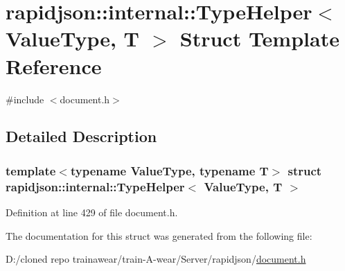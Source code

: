 \hypertarget{structrapidjson_1_1internal_1_1_type_helper}{}\section{rapidjson\+::internal\+::Type\+Helper$<$ Value\+Type, T $>$ Struct Template Reference}
\label{structrapidjson_1_1internal_1_1_type_helper}


{\ttfamily \#include $<$document.\+h$>$}



\subsection{Detailed Description}
\subsubsection*{template$<$typename Value\+Type, typename T$>$\newline
struct rapidjson\+::internal\+::\+Type\+Helper$<$ Value\+Type, T $>$}



Definition at line 429 of file document.\+h.



The documentation for this struct was generated from the following file\+:\begin{DoxyCompactItemize}
\item 
D\+:/cloned repo trainawear/train-\/\+A-\/wear/\+Server/rapidjson/\mbox{\hyperlink{document_8h}{document.\+h}}\end{DoxyCompactItemize}
